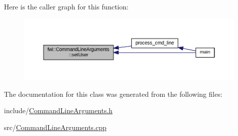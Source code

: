 Here is the caller graph for this function\-:\nopagebreak
\begin{figure}[H]
\begin{center}
\leavevmode
\includegraphics[width=350pt]{classfwi_1_1CommandLineArguments_aba8081f570985fba7c0746e4152857a1_icgraph}
\end{center}
\end{figure}




The documentation for this class was generated from the following files\-:\begin{DoxyCompactItemize}
\item 
include/\hyperlink{CommandLineArguments_8h}{Command\-Line\-Arguments.\-h}\item 
src/\hyperlink{CommandLineArguments_8cpp}{Command\-Line\-Arguments.\-cpp}\end{DoxyCompactItemize}
